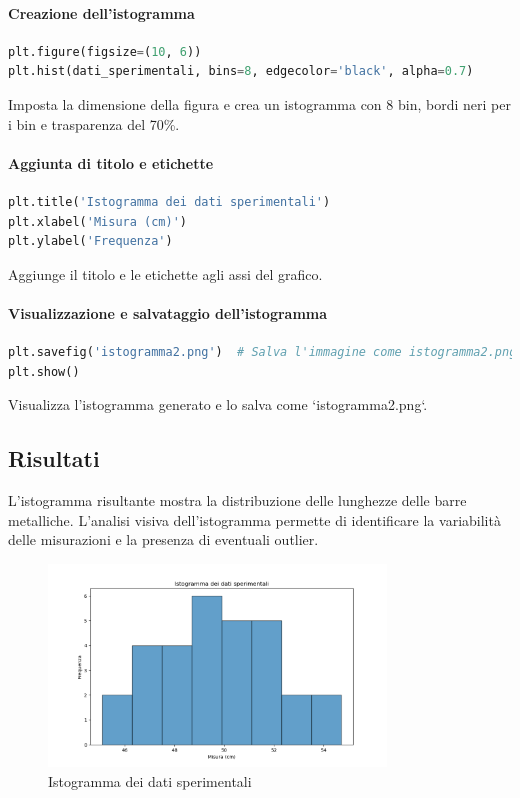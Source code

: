 \paragraph{Creazione dell'istogramma}
\begin{lstlisting}[language=Python, caption=Creazione dell'istogramma]
plt.figure(figsize=(10, 6))
plt.hist(dati_sperimentali, bins=8, edgecolor='black', alpha=0.7)
\end{lstlisting}
Imposta la dimensione della figura e crea un istogramma con 8 bin, bordi neri per i bin e trasparenza del 70\%.

\paragraph{Aggiunta di titolo e etichette}
\begin{lstlisting}[language=Python, caption=Aggiunta di titolo e etichette]
plt.title('Istogramma dei dati sperimentali')
plt.xlabel('Misura (cm)')
plt.ylabel('Frequenza')
\end{lstlisting}
Aggiunge il titolo e le etichette agli assi del grafico.

\paragraph{Visualizzazione e salvataggio dell'istogramma}
\begin{lstlisting}[language=Python, caption=Visualizzazione e salvataggio dell'istogramma]
plt.savefig('istogramma2.png')  # Salva l'immagine come istogramma2.png
plt.show()
\end{lstlisting}
Visualizza l'istogramma generato e lo salva come `istogramma2.png`.

\subsection{Risultati}
L'istogramma risultante mostra la distribuzione delle lunghezze delle barre metalliche. L'analisi visiva dell'istogramma permette di identificare la variabilità delle misurazioni e la presenza di eventuali outlier.

\begin{figure}[!htbp] 
    \centering
    \includegraphics[width=0.8\textwidth]{istogramma2.png}
    \caption{Istogramma dei dati sperimentali}
    \label{fig:istogramma2}
\end{figure}



